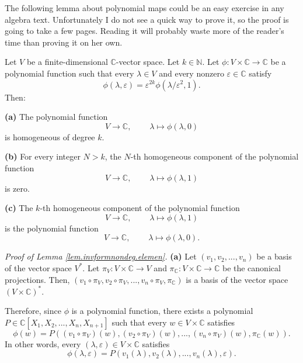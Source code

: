 \documentclass[etingof-lie.tex]{subfiles}
\begin{document}
The following lemma about polynomial maps could be an easy exercise in any
algebra text. Unfortunately I do not see a quick way to prove it, so the proof
is going to take a few pages. Reading it will probably waste more of the
reader's time than proving it on her own.

\begin{lemma}
\label{lem.invformnondeg.elemen}Let $V$ be a finite-dimensional $\mathbb{C}%
$-vector space. Let $k\in\mathbb{N}$. Let $\phi:V\times\mathbb{C}%
\rightarrow\mathbb{C}$ be a polynomial function such that every $\lambda\in V$
and every nonzero $\varepsilon\in\mathbb{C}$ satisfy%
\[
\phi\left(  \lambda,\varepsilon\right)  =\varepsilon^{2k}\phi\left(
\lambda/\varepsilon^{2},1\right)  .
\]
Then:

\textbf{(a)} The polynomial function
\[
V\rightarrow\mathbb{C},\ \ \ \ \ \ \ \ \ \ \lambda\mapsto\phi\left(
\lambda,0\right)
\]
is homogeneous of degree $k$.

\textbf{(b)} For every integer $N>k$, the $N$-th homogeneous component of the
polynomial function%
\[
V\rightarrow\mathbb{C},\ \ \ \ \ \ \ \ \ \ \lambda\mapsto\phi\left(
\lambda,1\right)
\]
is zero.

\textbf{(c)} The $k$-th homogeneous component of the polynomial function%
\[
V\rightarrow\mathbb{C},\ \ \ \ \ \ \ \ \ \ \lambda\mapsto\phi\left(
\lambda,1\right)
\]
is the polynomial function%
\[
V\rightarrow\mathbb{C},\ \ \ \ \ \ \ \ \ \ \lambda\mapsto\phi\left(
\lambda,0\right)  .
\]

\end{lemma}

\textit{Proof of Lemma \ref{lem.invformnondeg.elemen}.} \textbf{(a)} Let
$\left(  v_{1},v_{2},...,v_{n}\right)  $ be a basis of the vector space
$V^{\ast}$. Let $\pi_{V}:V\times\mathbb{C}\rightarrow V$ and $\pi_{\mathbb{C}%
}:V\times\mathbb{C}\rightarrow\mathbb{C}$ be the canonical projections. Then,
$\left(  v_{1}\circ\pi_{V},v_{2}\circ\pi_{V},...,v_{n}\circ\pi_{V}%
,\pi_{\mathbb{C}}\right)  $ is a basis of the vector space $\left(
V\times\mathbb{C}\right)  ^{\ast}$.

Therefore, since $\phi$ is a polynomial function, there exists a polynomial
$P\in\mathbb{C}\left[  X_{1},X_{2},...,X_{n},X_{n+1}\right]  $ such that every
$w\in V\times\mathbb{C}$ satisfies%
\[
\phi\left(  w\right)  =P\left(  \left(  v_{1}\circ\pi_{V}\right)  \left(
w\right)  ,\left(  v_{2}\circ\pi_{V}\right)  \left(  w\right)  ,...,\left(
v_{n}\circ\pi_{V}\right)  \left(  w\right)  ,\pi_{\mathbb{C}}\left(  w\right)
\right)  .
\]
In other words, every $\left(  \lambda,\varepsilon\right)  \in V\times
\mathbb{C}$ satisfies%
\begin{equation}
\phi\left(  \lambda,\varepsilon\right)  =P\left(  v_{1}\left(  \lambda\right)
,v_{2}\left(  \lambda\right)  ,...,v_{n}\left(  \lambda\right)  ,\varepsilon
\right)  . \label{pf.invformnondeg.elemen.1}%
\end{equation}
\end{document}
